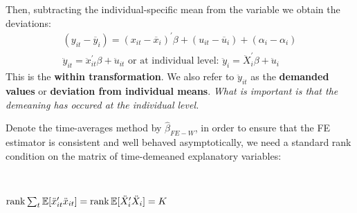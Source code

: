 Then, subtracting the individual-specific mean from the variable we obtain the deviations:
\begin{gather*}
    (y_{it} - \overline{y}_i) = (x_{it} - \overline{x}_i)^{\prime} \beta + (u_{it} -\overline{u}_i) + (\alpha_i - \alpha_i) \\
    \ddot{y}_{it} = \ddot{x}_{it}^{\prime} \beta + \ddot{u}_{it} \text{ or at individual level: } \ddot{y}_i = \ddot{X}_i^{\prime} \beta + \ddot{u}_i
\end{gather*}
This is the \textbf{within transformation}. We also refer to $\ddot{y}_{it}$ as the \textbf{demanded values} or \textbf{deviation from individual means}.
\emph{What is important is that the demeaning has occured at the individual level.}

Denote the time-averages method by $\hat{\beta}_{FE-W}$, in order to ensure that the FE estimator is consistent and 
well behaved asymptotically, we need a standard rank condition on the matrix of time-demeaned explanatory variables:
\begin{assumption}\label{assumption:FE-rank}
    \

    $\operatorname{rank} \sum_{t} \mathbb{E}[\ddot{x}_{it}^{\prime} \ddot{x}_{it}] = \operatorname{rank} \mathbb{E}[\ddot{X}_i^{\prime} \ddot{X}_i] = K$
\end{assumption}

